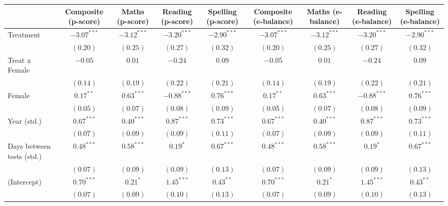 
\begin{table}
\begin{center}
\begin{tabular}{l c c c c c c c c}
\hline
 & Composite (p-score) & Maths (p-score) & Reading (p-score) & Spelling (p-score) & Composite (e-balance) & Maths (e-balance) & Reading (e-balance) & Spelling (e-balance) \\
\hline
Treatment                 & $-3.07^{***}$ & $-3.12^{***}$ & $-3.20^{***}$ & $-2.90^{***}$ & $-3.07^{***}$ & $-3.12^{***}$ & $-3.20^{***}$ & $-2.90^{***}$ \\
                          & $(0.20)$      & $(0.25)$      & $(0.27)$      & $(0.32)$      & $(0.20)$      & $(0.25)$      & $(0.27)$      & $(0.32)$      \\
Treat x Female            & $-0.05$       & $0.01$        & $-0.24$       & $0.09$        & $-0.05$       & $0.01$        & $-0.24$       & $0.09$        \\
                          & $(0.14)$      & $(0.19)$      & $(0.22)$      & $(0.21)$      & $(0.14)$      & $(0.19)$      & $(0.22)$      & $(0.21)$      \\
Female                    & $0.17^{**}$   & $0.63^{***}$  & $-0.88^{***}$ & $0.76^{***}$  & $0.17^{**}$   & $0.63^{***}$  & $-0.88^{***}$ & $0.76^{***}$  \\
                          & $(0.05)$      & $(0.07)$      & $(0.08)$      & $(0.09)$      & $(0.05)$      & $(0.07)$      & $(0.08)$      & $(0.09)$      \\
Year (std.)               & $0.67^{***}$  & $0.40^{***}$  & $0.87^{***}$  & $0.73^{***}$  & $0.67^{***}$  & $0.40^{***}$  & $0.87^{***}$  & $0.73^{***}$  \\
                          & $(0.07)$      & $(0.09)$      & $(0.09)$      & $(0.11)$      & $(0.07)$      & $(0.09)$      & $(0.09)$      & $(0.11)$      \\
Days between tests (std.) & $0.48^{***}$  & $0.58^{***}$  & $0.19^{*}$    & $0.67^{***}$  & $0.48^{***}$  & $0.58^{***}$  & $0.19^{*}$    & $0.67^{***}$  \\
                          & $(0.07)$      & $(0.09)$      & $(0.09)$      & $(0.13)$      & $(0.07)$      & $(0.09)$      & $(0.09)$      & $(0.13)$      \\
(Intercept)               & $0.70^{***}$  & $0.21^{*}$    & $1.45^{***}$  & $0.43^{**}$   & $0.70^{***}$  & $0.21^{*}$    & $1.45^{***}$  & $0.43^{**}$   \\
                          & $(0.07)$      & $(0.09)$      & $(0.10)$      & $(0.13)$      & $(0.07)$      & $(0.09)$      & $(0.10)$      & $(0.13)$      \\

\end{tabular}
\end{center}
\end{table}
